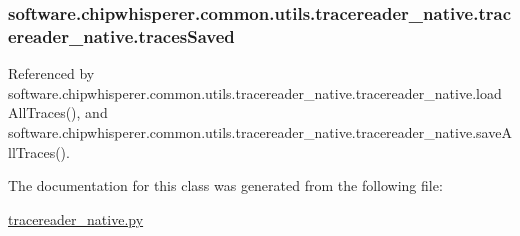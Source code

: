 \hypertarget{classsoftware_1_1chipwhisperer_1_1common_1_1utils_1_1tracereader__native_1_1tracereader__native_a5075d6bd9a68c0852a723b15e95c5c9a}{}
\subsubsection[{traces\+Saved}]{\setlength{\rightskip}{0pt plus 5cm}software.\+chipwhisperer.\+common.\+utils.\+tracereader\+\_\+native.\+tracereader\+\_\+native.\+traces\+Saved}\label{classsoftware_1_1chipwhisperer_1_1common_1_1utils_1_1tracereader__native_1_1tracereader__native_a5075d6bd9a68c0852a723b15e95c5c9a}


Referenced by software.\+chipwhisperer.\+common.\+utils.\+tracereader\+\_\+native.\+tracereader\+\_\+native.\+load\+All\+Traces(), and software.\+chipwhisperer.\+common.\+utils.\+tracereader\+\_\+native.\+tracereader\+\_\+native.\+save\+All\+Traces().



The documentation for this class was generated from the following file\+:\begin{DoxyCompactItemize}
\item 
\hyperlink{tracereader__native_8py}{tracereader\+\_\+native.\+py}\end{DoxyCompactItemize}
